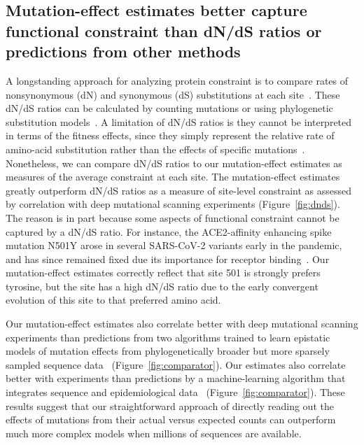 \documentclass[9pt,twocolumn,twoside]{gsajnl_modified}
\begin{document}
\subsection*{Mutation-effect estimates better capture functional constraint than dN/dS ratios or predictions from other methods}
A longstanding approach for analyzing protein constraint is to compare rates of nonsynonymous (dN) and synonymous (dS) substitutions at each site~\citep{nielsen1998likelihood,kosakovsky2005not}.
These dN/dS ratios can be calculated by counting mutations or using phylogenetic substitution models~\citep{kosakovsky2005not,yang2000estimating}.
A limitation of dN/dS ratios is they cannot be interpreted in terms of the fitness effects, since they simply represent the relative rate of amino-acid substitution rather than the effects of specific mutations~\citep{spielman2015relationship,kryazhimskiy2008population}.
Nonetheless, we can compare dN/dS ratios to our mutation-effect estimates as measures of the average constraint at each site.
The mutation-effect estimates greatly outperform dN/dS ratios as a measure of site-level constraint as assessed by correlation with deep mutational scanning experiments (Figure~\ref{fig:dnds}).
The reason is in part because some aspects of functional constraint cannot be captured by a dN/dS ratio.
For instance, the ACE2-affinity enhancing spike mutation N501Y arose in several SARS-CoV-2 variants early in the pandemic, and has since remained fixed due its importance for receptor binding~\citep{starr2022deep}.
Our mutation-effect estimates correctly reflect that site 501 is strongly prefers tyrosine, but the site has a high dN/dS ratio due to the early convergent evolution of this site to that preferred amino acid.

Our mutation-effect estimates also correlate better with deep mutational scanning experiments than predictions from two algorithms trained to learn epistatic models of mutation effects from phylogenetically broader but more sparsely sampled sequence data~\cite{thadani2022learning,rodriguez2022epistatic} (Figure~\ref{fig:comparator}).
Our estimates also correlate better with experiments than predictions by a machine-learning algorithm that integrates sequence and epidemiological data~\cite{maher2022predicting} (Figure~\ref{fig:comparator}).
These results suggest that our straightforward approach of directly reading out the effects of mutations from their actual versus expected counts can outperform much more complex models when millions of sequences are available.
\end{document}
